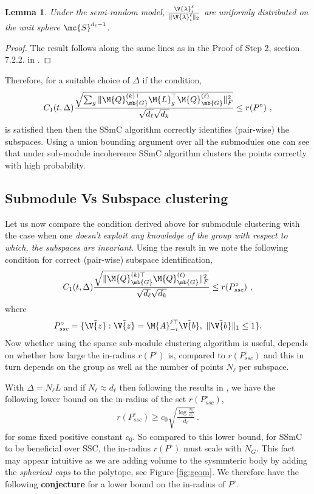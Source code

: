 \documentclass[conference]{IEEEtran}
\newtheorem{lemma}[theorem]{Lemma}
\begin{document}
\begin{lemma} 
\label{lem:1}
Under the semi-random model, $\frac{\V{\lambda}_i^\ell}{\| \V{\lambda}_i^\ell\|_2}$ are uniformly distributed on the unit sphere $\mc{S}^{d_\ell-1}$.
\end{lemma}
\begin{proof}
The result follows along the same lines as in the Proof of Step 2, section 7.2.2. in \cite{Soltanolkotabi:2012ia}.
\end{proof}

Therefore, for a suitable choice of $\Delta$ if the condition,
\begin{align}
C_1(t, \Delta) \frac{\sqrt{\sum_{g}\|\M{Q}_{\mb{G}}^{(k)\top} \M{L}_{g}^{\top} \M{Q}_{\mb{G}}^{(\ell)} \|_{F}^{2}}}{\sqrt{d_\ell} \sqrt{d_k}} \leq r(P^{\circ})\,\, ,
\end{align}
is satisfied then then the SSmC algorithm correctly identifies (pair-wise) the subspaces. Using a union bounding argument over all the submodules one can see that under sub-module incoherence SSmC algorithm clusters the points correctly with high probability.

\subsection{Submodule Vs Subspace clustering}

Let us now compare the condition derived above for submodule clustering with the case when one \emph{doesn't exploit any knowledge of the group with respect to which, the subspaces are invariant}. Using the result in \cite{Soltanolkotabi:2012ia} we note the following condition for correct (pair-wise) subspace identification, 
\begin{align}
C_1(t, \Delta) \frac{\sqrt{\|\M{Q}_{\mb{G}}^{(k)\top} \M{Q}_{\mb{G}}^{(\ell)} \|_{F}^{2}}}{\sqrt{d_\ell} \sqrt{d_k}} \leq r(P_{ssc}^{\circ})\,\, ,
\end{align}
where $$P_{ssc}^{\circ} = \{\tilde{\V{z}}: \tilde{\V{z}} =  \M{A}_{-i}^{\ell \top} \tilde{\V{b}},\,\, \| \tilde{\V{b}} \|_{1} \leq 1\}.$$
Now whether using the sparse sub-module clustering algorithm is useful, depends on whether how large the in-radius $r(P^{\circ})$ is, compared to $r(P_{ssc}^{\circ})$ and this in turn depends on the group as well as the number of points $N_\ell$ per subspace. 

With $\Delta = N_\ell L$ and if $N_\ell \approx d_\ell$ then following the results in \cite{Soltanolkotabi:2012ia}, we have the following lower bound on the in-radius of the set $r(P_{ssc}^{\circ})$,
\begin{align}
r(P_{ssc}^{\circ}) \geq c_0 \sqrt{\frac{\log \frac{N_\ell}{d_\ell}}{d_\ell}}\, .
\end{align}
for some fixed positive constant $c_0$. So compared to this lower bound, for SSmC to be beneficial over SSC, the in-radius $r(P^\circ)$ must scale with $N_G$. This fact may appear intuitive as we are adding volume to the sysmmteric body by adding the \emph{spherical caps} to the polytope, see Figure \ref{fig:geom}. We therefore have the following \textbf{conjecture} for a lower bound on the in-radius of $P^\circ$.
\end{document}
